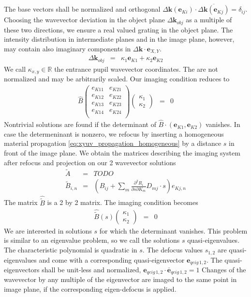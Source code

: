 \documentclass[12pt,a4paper,twoside,openright,BCOR10mm,headsepline,titlepage,abstracton,chapterprefix,final]{scrreprt}
\newcommand\Vector[1]{{\mathbf{#1}}}
\newcommand\wavenumber{k}
\newcommand\Wavevector{\Vector{\wavenumber}}
\begin{document}
The base vectors shall be normalized and orthogonal 
$\Delta \Wavevector(\Vector{e}_{Ki}) \cdot \overline{\Delta \Wavevector (\Vector{e}_{Kj})} = \delta_{ij}$.
Choosing the wavevector deviation in the object plane $\Delta \Wavevector_{obj}$ as a multiple of these two directions,
we ensure a real valued grating in the object plane. 
The intensity distribution in intermediate planes and in the image plane, however, 
may contain also imaginary components in $\Delta \Wavevector \cdot \Vector{e}_{X,Y}$.
\begin{eqnarray}
 \Delta \Wavevector_{obj} &=& \kappa_1 \Vector{e}_{K1} + \kappa_2 \Vector{e}_{K2} \label{eq:deltaK_as_kappa}
\end{eqnarray}
We call $\kappa_{x,y} \in \mathbb{R}$ the entrance pupil wavevector coordinates. The are not normalized and may be arbitrarily scaled.
Our imaging condition reduces to
\begin{eqnarray}
 \hat{B}
 \begin{pmatrix}
 e_{K11} & e_{K21} \\
 e_{K12} & e_{K22} \\
 e_{K13} & e_{K23} \\
 e_{K14} & e_{K24} \\ 
 \end{pmatrix}
 \begin{pmatrix}
 \kappa_1 \\ \kappa_2 
 \end{pmatrix}
 &=& 0
\end{eqnarray}
Nontrivial solutions are found if the determinant of $\hat{B} \cdot(\Vector{e}_{K1}, \Vector{e}_{K2})$ vanishes.
In case the determeninant is nonzero, 
we refocus by inserting a homogeneous material propagation \eqref{eq:xyuv_propagation_homogeneous} by a distance $s$ 
in front of the image plane.
We obtain the matrices describing the imaging system after refocus and projection on our 2 wavevector solutions
\begin{eqnarray}
 \tilde{A} &=& TODO \\
 \tilde{B}_{i,n} &=& \left( B_{ij} + \sum_m \frac{\partial^2 R_i}{\partial s \partial K_m} D_{mj} \cdot s \right) e_{Kj,n} \label{eq:tildeB}
\end{eqnarray}
The matrix $\hat{\tilde{B}}$ is a 2 by 2 matrix.
The imaging condition becomes
\begin{eqnarray}
 \hat{\tilde{B}}(s) \begin{pmatrix} \kappa_1 \\ \kappa_2 \end{pmatrix} &=& 0
\end{eqnarray}
We are interested in solutions $s$ for which the determinant vanishes.
This problem is similar to an eigenvalue problem, so we call the solutions $s$ quasi-eigenvalues.
The characteristic polynomial is quadratic in $s$.
The defocus values $s_{1,2}$ are quasi-eigenvalues 
and come with a corresponding quasi-eigenvector $\Vector{e}_{qeig\,1,2}$.
The quasi-eigenvectors shall be unit-less and normalized, $\Vector{e}_{qeig\,1,2} \cdot \overline{\Vector{e}}_{qeig\,1,2} = 1$
Changes of the wavevector by any multiple of the eigenvector are imaged to the same point in image plane, 
if the corresponding eigen-defocus is applied.
\end{document}
